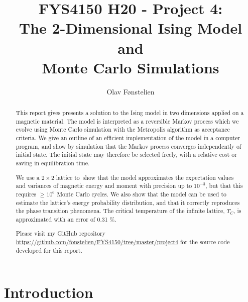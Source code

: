 \documentclass[]{article}
\title{FYS4150 H20 - Project 4:\\The 2-Dimensional Ising Model and \\Monte Carlo Simulations}
\author{Olav Fønstelien}
\begin{document}
\maketitle

\begin{abstract}

This report gives presents a solution to the Ising model in two dimensions applied on a magnetic material. The model is interpreted as a reversible Markov process which we evolve using Monte Carlo simulation with the Metropolis algorithm as acceptance criteria. We give an outline of an efficient implementation of the model in a computer program, and show by simulation that the Markov process converges independently of initial state. The initial state may therefore be selected freely, with a relative cost or saving in equilibration time.

We use a $2 \times 2$ lattice to show that the model approximates the expectation values and variances of magnetic energy and moment with precision up to $10^{-3}$, but that this requires $\ge 10^6$ Monte Carlo cycles. We also show that the model can be used to estimate the lattice's energy probability distribution, and that it correctly reproduces the phase transition phenomena. The critical temperature of the infinite lattice, $T_C$, is approximated with an error of 0.31 \%.

Please visit my GitHub repository \url{https://github.com/fonstelien/FYS4150/tree/master/project4} for the source code developed for this report.

\end{abstract}

\section{Introduction} \label{sec:intro}
\end{document}
